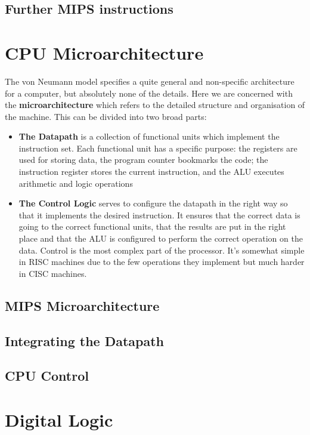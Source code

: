 \documentclass{article}
\begin{document}
	\subsection{Further MIPS instructions}
		
	
	\section{CPU Microarchitecture}
	The von Neumann model specifies a quite general and non-specific architecture for a computer, but absolutely none of the details. Here we are concerned with the \textbf{microarchitecture} which refers to the detailed structure and organisation of the machine. This can be divided into two broad parts:
	\begin{itemize}
		\item \textbf{The Datapath} is a collection of functional units which implement the instruction set. Each functional unit has a specific purpose: the registers are used for storing data, the program counter bookmarks the code; the instruction register stores the current instruction, and the ALU executes arithmetic and logic operations
		
		\item \textbf{The Control Logic} serves to configure the datapath in the right way so that it implements the desired instruction. It ensures that the correct data is going to the correct functional units, that the results are put in the right place and that the ALU is configured to perform the correct operation on the data. Control is the most complex part of the processor. It's somewhat simple in RISC machines due to the few operations they implement but much harder in CISC machines.
	\end{itemize}
	\subsection{MIPS Microarchitecture}
	\subsection{Integrating the Datapath}
	\subsection{CPU Control}
	
	\section{Digital Logic}
\end{document}

